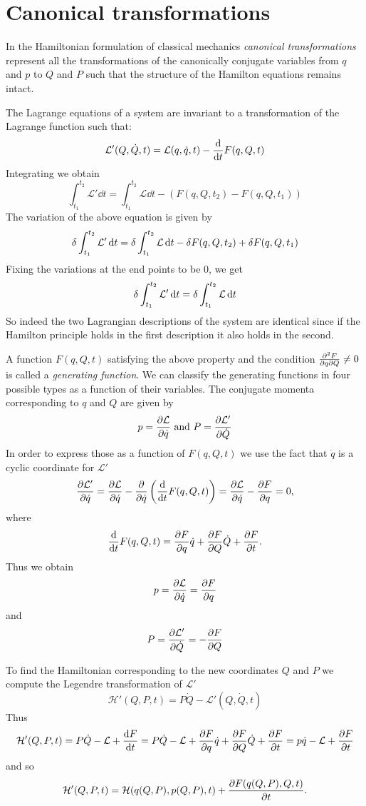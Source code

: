 \documentclass[../thesis.tex]{subfiles}
\begin{document}
\section{Canonical transformations}

In the Hamiltonian formulation of classical mechanics \emph{canonical transformations}
represent all the transformations of the canonically conjugate variables from
$q$ and $p$ to $Q$ and $P$ such that the structure of the Hamilton equations remains intact.

The Lagrange equations of a system are invariant to a transformation of the
Lagrange function such that:
\[
  \mathcal{L'}(Q, \dot{Q}, t) = \mathcal{L}(q, \dot{q}, t) - \dv{t}F(q, Q, t)
\]
Integrating we obtain
\[
  \int_{t_1}^{t_2} \mathcal{L'} \dd{t} = \int_{t_1}^{t_2} \mathcal{L} \dd{t}
  - \left( F(q, Q, t_2) - F(q, Q, t_1) \right)
\]
The variation of the above equation is given by
\[
  \var{\int_{t_1}^{t_2} \mathcal{L'} \dd{t}} = \var{\int_{t_1}^{t_2} \mathcal{L} \dd{t}}
  - \var{F(q, Q, t_2)} + \var{F(q, Q, t_1)}
\]
Fixing the variations at the end points to be $0$, we get
\[
  \var{\int_{t_1}^{t_2} \mathcal{L'} \dd{t}} = \var{\int_{t_1}^{t_2} \mathcal{L} \dd{t}}
\]
So indeed the two Lagrangian descriptions of the system are identical since if the
\mbox{Hamilton} principle holds in the first description it also holds in the second.

A function \(F(q, Q, t)\) satisfying the above property and the condition
\(\pdv{F}{q}{Q} \neq 0\) is called a \emph{generating function}.
We can classify the generating functions in four possible types
as a function of their variables.
The conjugate momenta corresponding to $q$ and $Q$ are given by
\[
  p = \pdv{\mathcal{L}}{\dot{q}} \text{ and } P = \pdv{\mathcal{L'}}{\dot{Q}}
\]
In order to express those as a function of \(F(q, Q, t)\) we use the fact
that \(\dot{q}\) is a cyclic coordinate for \(\mathcal{L'}\)
\[
  \pdv{\mathcal{L'}}{\dot{q}} = \pdv{\mathcal{L}}{\dot{q}} -
  \pdv{\dot{q}} \left( \dv{t}F(q, Q, t) \right) =
  \pdv{\mathcal{L}}{\dot{q}} - \pdv{F}{q} = 0,
\]
where
\[
  \dv{t}F(q, Q, t) = \pdv{F}{q} \dot{q} + \pdv{F}{Q} \dot{Q} + \pdv{F}{t}.
\]
Thus we obtain
\[
  p = \pdv{\mathcal{L}}{\dot{q}} = \pdv{F}{q}
\]
and
\[
  P = \pdv{\mathcal{L'}}{\dot{Q}} = - \pdv{F}{Q}
\]

To find the Hamiltonian corresponding to the new coordinates $Q$ and $P$ we
compute the Legendre transformation of \(\mathcal{L'}\)
\[
  \mathcal{H'}(Q, P, t) = P\dot{Q} - \mathcal{L'}(Q, \dot{Q}, t)
\]
Thus
\[
  \mathcal{H'}(Q, P, t) = P\dot{Q} - \mathcal{L} + \dv{F}{t} =
  P\dot{Q} - \mathcal{L} + \pdv{F}{q} \dot{q} + \pdv{F}{Q} \dot{Q} + \pdv{F}{t} =
  p\dot{q} - \mathcal{L} + \pdv{F}{t}
\]
and so
\begin{equation}
  \label{eq:canonical-transf}
  \mathcal{H'}(Q, P, t) = \mathcal{H}(q(Q,P), p(Q, P), t) + \pdv{F(q(Q,P), Q, t)}{t}.
\end{equation}
\end{document}
